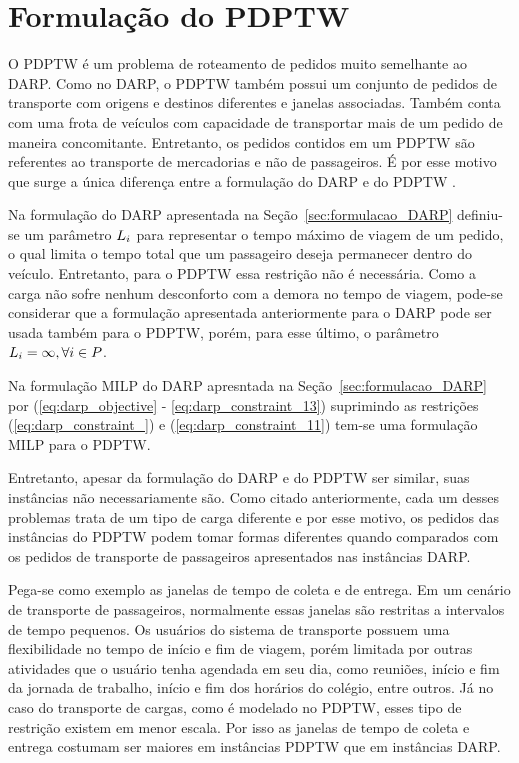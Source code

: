 \section{Formulação do PDPTW}\label{sec:formulacao_PDPTW}

O PDPTW é um problema de roteamento de pedidos muito semelhante ao DARP.
Como no DARP, o PDPTW também possui um conjunto de pedidos de transporte com
origens e destinos diferentes e janelas associadas.
Também conta com uma frota de veículos com capacidade de transportar mais de um
pedido de maneira concomitante.
Entretanto, os pedidos contidos em um PDPTW são referentes ao transporte de
mercadorias e não de passageiros.
É por esse motivo que surge a única diferença entre a formulação do DARP e do
PDPTW \cite{parragh_survey_2008}.

Na formulação do DARP apresentada na Seção~\ref{sec:formulacao_DARP} definiu-se
um parâmetro $L_i$ para representar o tempo máximo de viagem
de um pedido, o qual limita o tempo total que um passageiro deseja permanecer
dentro do veículo.
Entretanto, para o PDPTW essa restrição não é necessária. Como a carga não
sofre nenhum desconforto com a demora no tempo de viagem, pode-se considerar 
que a formulação apresentada anteriormente para o DARP pode ser usada também 
para o PDPTW, porém, para esse último, o parâmetro 
$L_i = \infty, \forall i \in P$.

Na formulação MILP do DARP apresntada na Seção~\ref{sec:formulacao_DARP} por
(\ref{eq:darp_objective} - \ref{eq:darp_constraint_13}) suprimindo as
restrições (\ref{eq:darp_constraint_}) e (\ref{eq:darp_constraint_11}) 
tem-se uma formulação MILP para o PDPTW.

\iffalse
Entretanto, apesar da formulação do DARP e do PDPTW ser similar, suas
instâncias não necessariamente são.
Como citado anteriormente, cada um desses problemas trata de um tipo de carga
diferente e por esse motivo, os pedidos das instâncias do PDPTW podem tomar
formas diferentes quando comparados com os pedidos de transporte de passageiros
apresentados nas instâncias DARP.

Pega-se como exemplo as janelas de tempo de coleta e de entrega.
Em um cenário de transporte de passageiros, normalmente essas janelas são
restritas a intervalos de tempo pequenos.
Os usuários do sistema de transporte possuem uma flexibilidade no tempo de
início e fim de viagem, porém limitada por outras atividades que o
usuário tenha agendada em seu dia, como reuniões, início e fim da jornada de
trabalho, início e fim dos horários do colégio, entre outros.
Já no caso do transporte de cargas, como é modelado no PDPTW, esses tipo de
restrição existem em menor escala.
Por isso as janelas de tempo de coleta e entrega costumam ser maiores em
instâncias PDPTW que em instâncias DARP.

